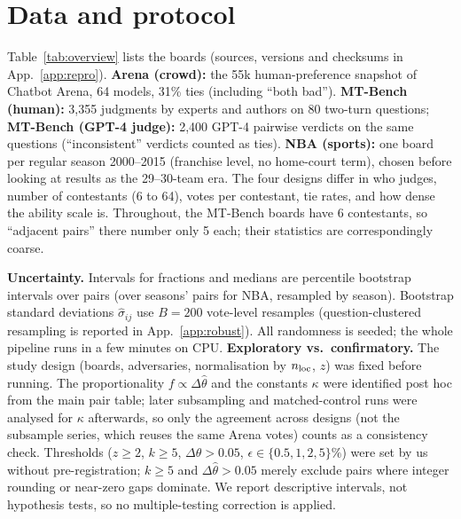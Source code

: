 \documentclass{article}
\newcommand{\nloc}{n_{\rm loc}}
\newcommand{\thh}{\hat\theta}
\begin{document}
\section{Data and protocol}\label{sec:data}
Table~\ref{tab:overview} lists the boards (sources, versions and checksums in App.~\ref{app:repro}). \textbf{Arena (crowd):} the 55k human-preference snapshot of Chatbot Arena, 64 models, 31\% ties (including ``both bad''). \textbf{MT-Bench (human):} 3{,}355 judgments by experts and authors on 80 two-turn questions; \textbf{MT-Bench (GPT-4 judge):} 2{,}400 GPT-4 pairwise verdicts on the same questions (``inconsistent'' verdicts counted as ties). \textbf{NBA (sports):} one board per regular season 2000--2015 (franchise level, no home-court term), chosen before looking at results as the 29--30-team era. The four designs differ in who judges, number of contestants (6 to 64), votes per contestant, tie rates, and how dense the ability scale is. Throughout, the MT-Bench boards have 6 contestants, so ``adjacent pairs'' there number only 5 each; their statistics are correspondingly coarse.

\textbf{Uncertainty.} Intervals for fractions and medians are percentile bootstrap intervals over pairs (over seasons' pairs for NBA, resampled by season). Bootstrap standard deviations $\hat\sigma_{ij}$ use $B=200$ vote-level resamples (question-clustered resampling is reported in App.~\ref{app:robust}). All randomness is seeded; the whole pipeline runs in a few minutes on CPU. \textbf{Exploratory vs.\ confirmatory.} The study design (boards, adversaries, normalisation by $\nloc$, $z$) was fixed before running. The proportionality $f\propto\Delta\thh$ and the constants $\kappa$ were identified post hoc from the main pair table; later subsampling and matched-control runs were analysed for $\kappa$ afterwards, so only the agreement across designs (not the subsample series, which reuses the same Arena votes) counts as a consistency check. Thresholds ($z\geq2$, $k\geq5$, $\Delta\thh>0.05$, $\epsilon\in\{0.5,1,2,5\}\%$) were set by us without pre-registration; $k\geq5$ and $\Delta\thh>0.05$ merely exclude pairs where integer rounding or near-zero gaps dominate. We report descriptive intervals, not hypothesis tests, so no multiple-testing correction is applied.

\begin{table}[t]
\caption{Boards studied. ``bootstrap $\tau$'': mean Kendall $\tau$ between the full-data ranking and bootstrap rankings; ``top-1 kept'': fraction of bootstrap fits with the same top contestant; last column: share of adjacent pairs with $z\geq2$ (bootstrap 95\% interval). NBA entries: median over 16 seasons (range).}\label{tab:overview}
\centering\scriptsize
\resizebox{\textwidth}{!}{}
\end{table}
\end{document}

